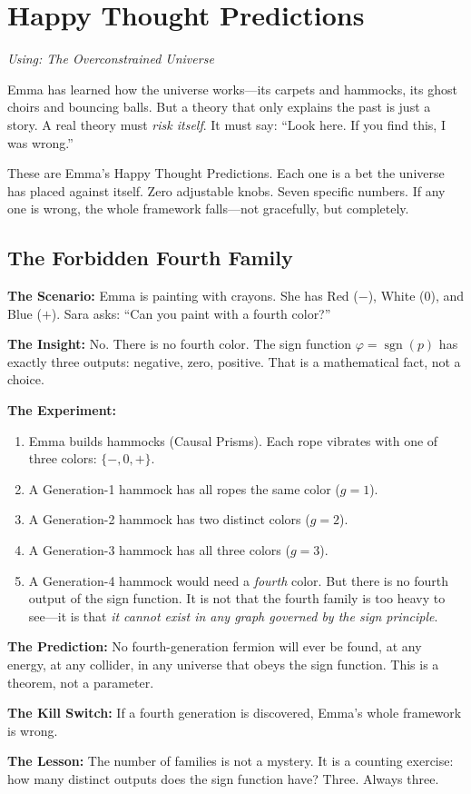 \documentclass[11pt, a4paper, openany]{book}
\begin{document}
\chapter{Happy Thought Predictions}
\textit{Using: The Overconstrained Universe}

Emma has learned how the universe works---its carpets and hammocks, its ghost choirs and bouncing balls. But a theory that only explains the past is just a story. A real theory must \emph{risk itself}. It must say: ``Look here. If you find this, I was wrong.''

These are Emma's Happy Thought Predictions. Each one is a bet the universe has placed against itself. Zero adjustable knobs. Seven specific numbers. If any one is wrong, the whole framework falls---not gracefully, but completely.

\section{The Forbidden Fourth Family}
\begin{thoughtexp}
\textbf{The Scenario:} Emma is painting with crayons. She has Red ($-$), White ($0$), and Blue ($+$). Sara asks: ``Can you paint with a fourth color?''

\textbf{The Insight:} No. There is no fourth color. The sign function $\varphi = \operatorname{sgn}(p)$ has exactly three outputs: negative, zero, positive. That is a mathematical fact, not a choice.

\textbf{The Experiment:}
\begin{enumerate}
  \item Emma builds hammocks (Causal Prisms). Each rope vibrates with one of three colors: $\{-, 0, +\}$.
  \item A Generation-1 hammock has all ropes the same color ($g = 1$).
  \item A Generation-2 hammock has two distinct colors ($g = 2$).
  \item A Generation-3 hammock has all three colors ($g = 3$).
  \item A Generation-4 hammock would need a \emph{fourth} color. But there is no fourth output of the sign function. It is not that the fourth family is too heavy to see---it is that \emph{it cannot exist in any graph governed by the sign principle}.
\end{enumerate}

\textbf{The Prediction:} No fourth-generation fermion will ever be found, at any energy, at any collider, in any universe that obeys the sign function. This is a theorem, not a parameter.

\textbf{The Kill Switch:} If a fourth generation is discovered, Emma's whole framework is wrong.

\textbf{The Lesson:} The number of families is not a mystery. It is a counting exercise: how many distinct outputs does the sign function have? Three. Always three.
\end{thoughtexp}
\end{document}
